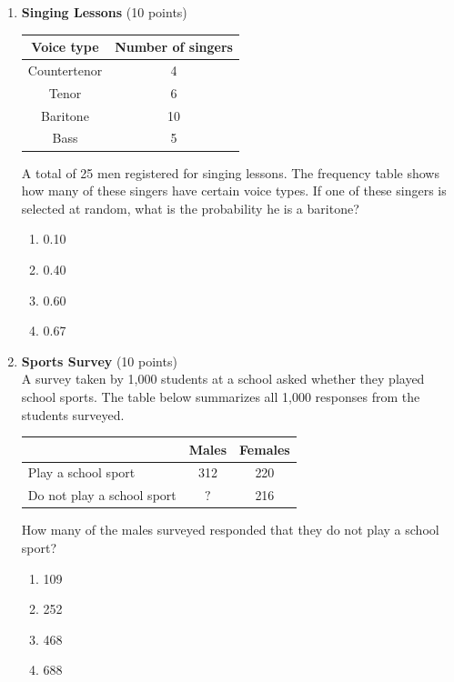 \begin{enumerate}
  \item \textbf{Singing Lessons} (10 points)\\
  \begin{center}
  \begin{tabular}{|c|c|}
  \hline
  Voice type & Number of singers \\
  \hline
  Countertenor & 4 \\
  \hline
  Tenor & 6 \\
  \hline
  Baritone & 10 \\
  \hline
  Bass & 5 \\
  \hline
  \end{tabular}
  \end{center}

  A total of 25 men registered for singing lessons. The frequency table shows how many of these singers have certain voice types. If one of these singers is selected at random, what is the probability he is a baritone?
  \begin{enumerate}[label=(\Alph*)]
    \item 0.10
    \item 0.40
    \item 0.60
    \item 0.67
  \end{enumerate}
  \begin{subanswer}
  \end{subanswer}

  \item \textbf{Sports Survey} (10 points)\\
  A survey taken by 1,000 students at a school asked whether they played school sports. The table below summarizes all 1,000 responses from the students surveyed.

  \begin{center}
  \begin{tabular}{|l|c|c|}
  \hline
  & Males & Females \\
  \hline
  Play a school sport & 312 & 220 \\
  \hline
  Do not play a school sport & $?$ & 216 \\
  \hline
  \end{tabular}
  \end{center}

  How many of the males surveyed responded that they do not play a school sport?
  \begin{enumerate}[label=(\Alph*)]
    \item 109
    \item 252
    \item 468
    \item 688
  \end{enumerate}
  \begin{subanswer}
  \end{subanswer}


\end{enumerate}

